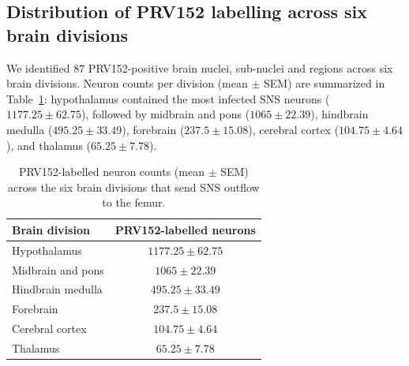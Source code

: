 \documentclass[11pt]{article}
\begin{document}
\subsection{Distribution of PRV152 labelling across six brain divisions}
We identified $87$ PRV152-positive brain nuclei, sub-nuclei and regions across six brain divisions. Neuron counts per division (mean $\pm$ SEM) are summarized in Table~\ref{tab:divisions}: hypothalamus contained the most infected SNS neurons ($1177.25 \pm 62.75$), followed by midbrain and pons ($1065 \pm 22.39$), hindbrain medulla ($495.25 \pm 33.49$), forebrain ($237.5 \pm 15.08$), cerebral cortex ($104.75 \pm 4.64$), and thalamus ($65.25 \pm 7.78$).

\begin{table}[h]
\centering
\caption{PRV152-labelled neuron counts (mean $\pm$ SEM) across the six brain divisions that send SNS outflow to the femur.}
\label{tab:divisions}
\begin{tabular}{lc}
\toprule
Brain division & PRV152-labelled neurons \\
\midrule
Hypothalamus & $1177.25 \pm 62.75$ \\
Midbrain and pons & $1065 \pm 22.39$ \\
Hindbrain medulla & $495.25 \pm 33.49$ \\
Forebrain & $237.5 \pm 15.08$ \\
Cerebral cortex & $104.75 \pm 4.64$ \\
Thalamus & $65.25 \pm 7.78$ \\
\bottomrule
\end{tabular}
\end{table}
\end{document}
